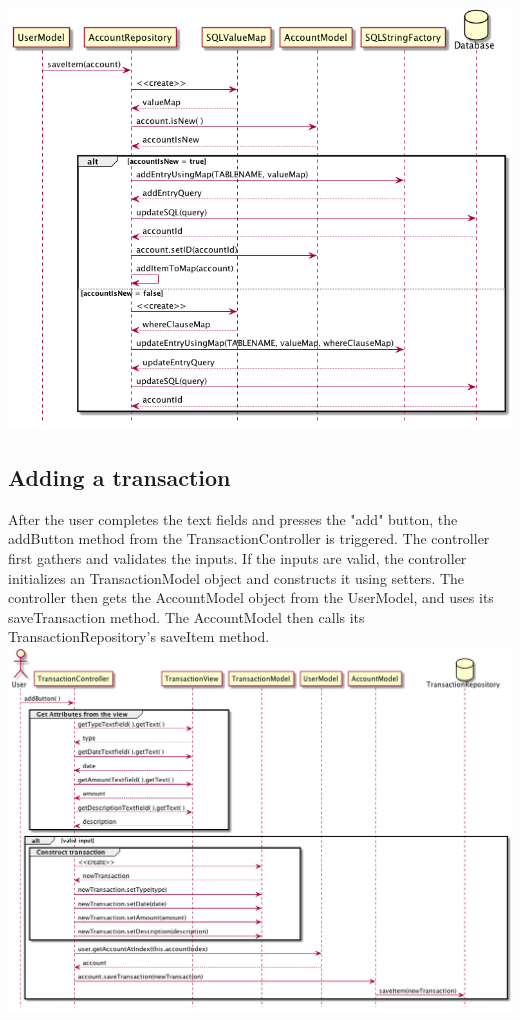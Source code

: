 \documentclass[12pt]{article}
\begin{document}
\includegraphics[width=\textwidth,height=\textheight,keepaspectratio]{diagrams/sequence/accRepoSaveItem.png}

\subsection{Adding a transaction}
After the user completes the text fields and presses the "add" button, the addButton method from the TransactionController is triggered. The controller first gathers and validates the inputs. If the inputs are valid, the controller initializes an TransactionModel object and constructs it using setters. The controller then gets the AccountModel object from the UserModel, and uses its saveTransaction method. The AccountModel then calls its TransactionRepository's saveItem method.
\includegraphics[width=\textwidth,height=\textheight,keepaspectratio]{diagrams/sequence/addTransaction.png}
\end{document}
